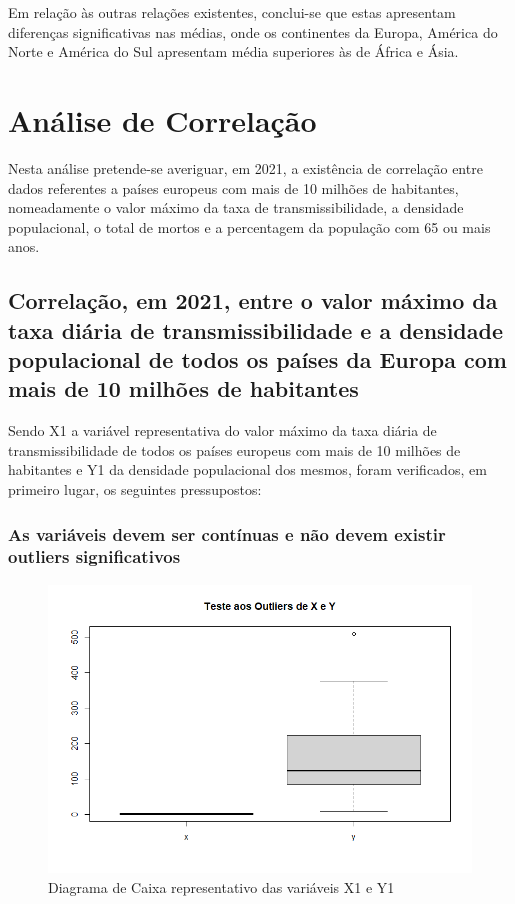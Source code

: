 \documentclass[conference]{IEEEtran}
\begin{document}
Em relação às outras relações existentes, conclui-se que estas apresentam diferenças significativas nas médias, onde os continentes da Europa, América do Norte e América do Sul apresentam média superiores às de África e Ásia.


\section{Análise de Correlação} %
Nesta análise pretende-se averiguar, em 2021, a existência de correlação entre dados referentes a países europeus com mais de 10 milhões de habitantes, nomeadamente o valor máximo da taxa de transmissibilidade, a densidade populacional, o total de mortos e a percentagem da população com 65 ou mais anos.

\subsection{Correlação, em 2021, entre o valor máximo da taxa diária de transmissibilidade e a densidade populacional de todos os países da Europa com mais de 10 milhões de habitantes}

Sendo X1 a variável representativa do valor máximo da taxa diária de transmissibilidade de todos os países europeus com mais de 10 milhões de habitantes e Y1 da densidade populacional dos mesmos, foram verificados, em primeiro lugar, os seguintes pressupostos:

\subsubsection{As variáveis devem ser contínuas e não devem existir outliers significativos}

\begin{figure}[htbp]
\centerline{\includegraphics[width=0.95\columnwidth]{images/03.a.1.png}}
\caption{Diagrama de Caixa representativo das variáveis X1 e Y1}
\label{3a1}
\end{figure}
\end{document}

